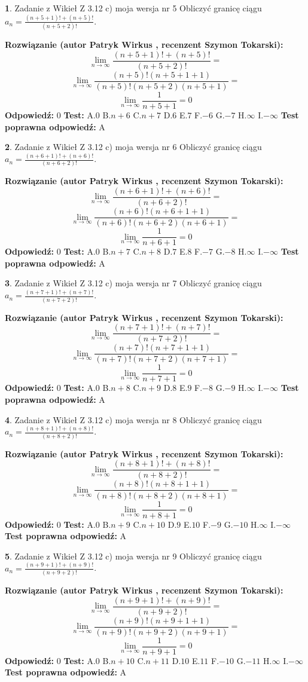 \documentclass[12pt, a4paper]{article}
\theoremstyle{definition} %
\newtheorem{zad}{}
\newcommand{\zadStart}[1]{\begin{zad}#1\newline}
\newcommand{\zadStop}{\end{zad}}
\newcommand{\rozwStart}[2]{\noindent \textbf{Rozwiązanie (autor #1 , recenzent #2): }\newline}
\newcommand{\rozwStop}{\newline}
\newcommand{\odpStart}{\noindent \textbf{Odpowiedź:}\newline}
\newcommand{\odpStop}{\newline}
\newcommand{\testStart}{\noindent \textbf{Test:}\newline}
\newcommand{\testStop}{\newline}
\newcommand{\kluczStart}{\noindent \textbf{Test poprawna odpowiedź:}\newline}
\newcommand{\kluczStop}{\newline}
\begin{document}
\zadStart{Zadanie z Wikieł Z 3.12 c) moja wersja nr 5}
Obliczyć granicę ciągu $a_{n}=\frac{(n+5+1)!+(n+5)!}{(n+5+2)!}$.
\zadStop
\rozwStart{Patryk Wirkus}{Szymon Tokarski}
$$\lim\limits_{n\to\infty}\frac{(n+5+1)!+(n+5)!}{(n+5+2)!}=$$
$$\lim\limits_{n\to\infty}\frac{(n+5)!(n+5+1+1)}{(n+5)!(n+5+2)(n+5+1)}=$$
$$\lim\limits_{n\to\infty}\frac{1}{n+5+1}= 0$$
\rozwStop
\odpStart
$0$
\odpStop
\testStart
A.$0$
B.$n+6$
C.$n+7$
D.$6$
E.$7$
F.$-6$
G.$-7$
H.$\infty$
I.$-\infty$
\testStop
\kluczStart
A
\kluczStop



\zadStart{Zadanie z Wikieł Z 3.12 c) moja wersja nr 6}
Obliczyć granicę ciągu $a_{n}=\frac{(n+6+1)!+(n+6)!}{(n+6+2)!}$.
\zadStop
\rozwStart{Patryk Wirkus}{Szymon Tokarski}
$$\lim\limits_{n\to\infty}\frac{(n+6+1)!+(n+6)!}{(n+6+2)!}=$$
$$\lim\limits_{n\to\infty}\frac{(n+6)!(n+6+1+1)}{(n+6)!(n+6+2)(n+6+1)}=$$
$$\lim\limits_{n\to\infty}\frac{1}{n+6+1}= 0$$
\rozwStop
\odpStart
$0$
\odpStop
\testStart
A.$0$
B.$n+7$
C.$n+8$
D.$7$
E.$8$
F.$-7$
G.$-8$
H.$\infty$
I.$-\infty$
\testStop
\kluczStart
A
\kluczStop



\zadStart{Zadanie z Wikieł Z 3.12 c) moja wersja nr 7}
Obliczyć granicę ciągu $a_{n}=\frac{(n+7+1)!+(n+7)!}{(n+7+2)!}$.
\zadStop
\rozwStart{Patryk Wirkus}{Szymon Tokarski}
$$\lim\limits_{n\to\infty}\frac{(n+7+1)!+(n+7)!}{(n+7+2)!}=$$
$$\lim\limits_{n\to\infty}\frac{(n+7)!(n+7+1+1)}{(n+7)!(n+7+2)(n+7+1)}=$$
$$\lim\limits_{n\to\infty}\frac{1}{n+7+1}= 0$$
\rozwStop
\odpStart
$0$
\odpStop
\testStart
A.$0$
B.$n+8$
C.$n+9$
D.$8$
E.$9$
F.$-8$
G.$-9$
H.$\infty$
I.$-\infty$
\testStop
\kluczStart
A
\kluczStop



\zadStart{Zadanie z Wikieł Z 3.12 c) moja wersja nr 8}
Obliczyć granicę ciągu $a_{n}=\frac{(n+8+1)!+(n+8)!}{(n+8+2)!}$.
\zadStop
\rozwStart{Patryk Wirkus}{Szymon Tokarski}
$$\lim\limits_{n\to\infty}\frac{(n+8+1)!+(n+8)!}{(n+8+2)!}=$$
$$\lim\limits_{n\to\infty}\frac{(n+8)!(n+8+1+1)}{(n+8)!(n+8+2)(n+8+1)}=$$
$$\lim\limits_{n\to\infty}\frac{1}{n+8+1}= 0$$
\rozwStop
\odpStart
$0$
\odpStop
\testStart
A.$0$
B.$n+9$
C.$n+10$
D.$9$
E.$10$
F.$-9$
G.$-10$
H.$\infty$
I.$-\infty$
\testStop
\kluczStart
A
\kluczStop



\zadStart{Zadanie z Wikieł Z 3.12 c) moja wersja nr 9}
Obliczyć granicę ciągu $a_{n}=\frac{(n+9+1)!+(n+9)!}{(n+9+2)!}$.
\zadStop
\rozwStart{Patryk Wirkus}{Szymon Tokarski}
$$\lim\limits_{n\to\infty}\frac{(n+9+1)!+(n+9)!}{(n+9+2)!}=$$
$$\lim\limits_{n\to\infty}\frac{(n+9)!(n+9+1+1)}{(n+9)!(n+9+2)(n+9+1)}=$$
$$\lim\limits_{n\to\infty}\frac{1}{n+9+1}= 0$$
\rozwStop
\odpStart
$0$
\odpStop
\testStart
A.$0$
B.$n+10$
C.$n+11$
D.$10$
E.$11$
F.$-10$
G.$-11$
H.$\infty$
I.$-\infty$
\testStop
\kluczStart
A
\kluczStop
\end{document}

